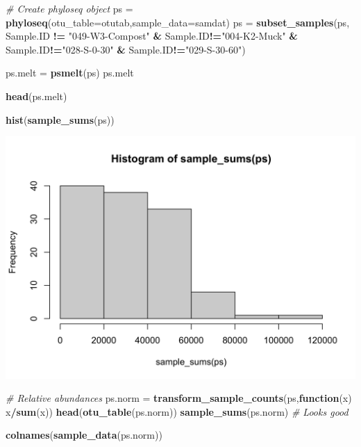 \documentclass[]{article}
\newenvironment{Shaded}{\begin{snugshade}}{\end{snugshade}}
\newcommand{\CommentTok}[1]{\textcolor[rgb]{0.56,0.35,0.01}{\textit{#1}}}
\newcommand{\ControlFlowTok}[1]{\textcolor[rgb]{0.13,0.29,0.53}{\textbf{#1}}}
\newcommand{\DataTypeTok}[1]{\textcolor[rgb]{0.13,0.29,0.53}{#1}}
\newcommand{\KeywordTok}[1]{\textcolor[rgb]{0.13,0.29,0.53}{\textbf{#1}}}
\newcommand{\NormalTok}[1]{#1}
\newcommand{\OperatorTok}[1]{\textcolor[rgb]{0.81,0.36,0.00}{\textbf{#1}}}
\newcommand{\StringTok}[1]{\textcolor[rgb]{0.31,0.60,0.02}{#1}}
\begin{document}
\begin{Shaded}
\begin{Highlighting}[]
\CommentTok{# Create phyloseq object}
\NormalTok{ps =}\StringTok{ }\KeywordTok{phyloseq}\NormalTok{(}\DataTypeTok{otu_table=}\NormalTok{otutab,}\DataTypeTok{sample_data=}\NormalTok{samdat)}
\NormalTok{ps =}\StringTok{ }\KeywordTok{subset_samples}\NormalTok{(ps, Sample.ID }\OperatorTok{!=}\StringTok{ "049-W3-Compost"} \OperatorTok{&}\StringTok{ }\NormalTok{Sample.ID}\OperatorTok{!=}\StringTok{"004-K2-Muck"} \OperatorTok{&}\StringTok{ }\NormalTok{Sample.ID}\OperatorTok{!=}\StringTok{"028-S-0-30"} \OperatorTok{&}\StringTok{ }\NormalTok{Sample.ID}\OperatorTok{!=}\StringTok{"029-S-30-60"}\NormalTok{)}
\end{Highlighting}
\end{Shaded}

\begin{Shaded}
\begin{Highlighting}[]
\NormalTok{ps.melt =}\StringTok{ }\KeywordTok{psmelt}\NormalTok{(ps)}
\NormalTok{ps.melt}

\KeywordTok{head}\NormalTok{(ps.melt)}

\KeywordTok{hist}\NormalTok{(}\KeywordTok{sample_sums}\NormalTok{(ps))}
\end{Highlighting}
\end{Shaded}

\includegraphics{output-rmd/unnamed-chunk-1-1.png}

\begin{Shaded}
\begin{Highlighting}[]
\CommentTok{# Relative abundances}
\NormalTok{ps.norm =}\StringTok{ }\KeywordTok{transform_sample_counts}\NormalTok{(ps,}\ControlFlowTok{function}\NormalTok{(x) x}\OperatorTok{/}\KeywordTok{sum}\NormalTok{(x))}
\KeywordTok{head}\NormalTok{(}\KeywordTok{otu_table}\NormalTok{(ps.norm))}
\KeywordTok{sample_sums}\NormalTok{(ps.norm)}
\CommentTok{# Looks good}

\KeywordTok{colnames}\NormalTok{(}\KeywordTok{sample_data}\NormalTok{(ps.norm))}
\end{Highlighting}
\end{Shaded}
\end{document}
